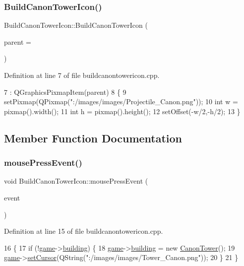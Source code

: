 \subsubsection{\texorpdfstring{Build\+Canon\+Tower\+Icon()}{BuildCanonTowerIcon()}}
{\footnotesize\ttfamily Build\+Canon\+Tower\+Icon\+::\+Build\+Canon\+Tower\+Icon (\begin{DoxyParamCaption}\item[{Q\+Graphics\+Item $\ast$}]{parent = {} }\end{DoxyParamCaption})}



Definition at line 7 of file buildcanontowericon.\+cpp.


\begin{DoxyCode}
7                                                              : QGraphicsPixmapItem(parent)
8 \{
9     setPixmap(QPixmap(\textcolor{stringliteral}{":/images/images/Projectile\_Canon.png"}));
10     \textcolor{keywordtype}{int} w = pixmap().width();
11     \textcolor{keywordtype}{int} h = pixmap().height();
12     setOffset(-w/2,-h/2);
13 \}
\end{DoxyCode}


\subsection{Member Function Documentation}
\mbox{\label{class_build_canon_tower_icon_a81a8a1c5a2c312fb7facc4c9e423b6e5}} 
\subsubsection{\texorpdfstring{mouse\+Press\+Event()}{mousePressEvent()}}
{\footnotesize\ttfamily void Build\+Canon\+Tower\+Icon\+::mouse\+Press\+Event (\begin{DoxyParamCaption}\item[{Q\+Graphics\+Scene\+Mouse\+Event $\ast$}]{event }\end{DoxyParamCaption})}



Definition at line 15 of file buildcanontowericon.\+cpp.


\begin{DoxyCode}
16 \{
17     \textcolor{keywordflow}{if} (!\hyperlink{buildcanontowericon_8cpp_a58bdb5643d0814ac4e697a1564b79b70}{game}->\hyperlink{class_game_a5917b4e021a93be7666ebc2ef4529401}{building}) \{
18         \hyperlink{buildcanontowericon_8cpp_a58bdb5643d0814ac4e697a1564b79b70}{game}->\hyperlink{class_game_a5917b4e021a93be7666ebc2ef4529401}{building} = \textcolor{keyword}{new} \hyperlink{class_canon_tower}{CanonTower}();
19         \hyperlink{buildcanontowericon_8cpp_a58bdb5643d0814ac4e697a1564b79b70}{game}->\hyperlink{class_game_a7272e282812b8af0be83044db196dc6c}{setCursor}(QString(\textcolor{stringliteral}{":/images/images/Tower\_Canon.png"}));
20     \}
21 \}
\end{DoxyCode}


